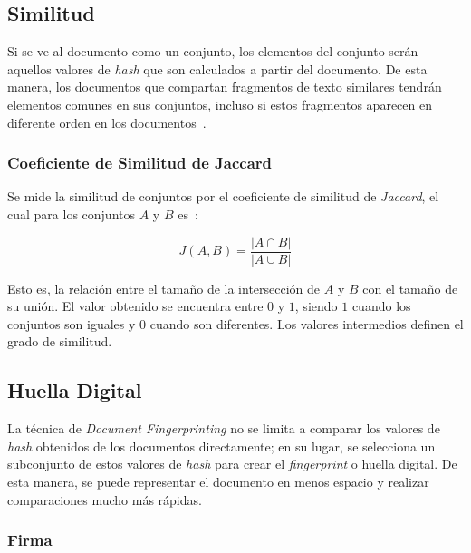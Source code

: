 \subsection{Similitud}

Si se ve al documento como un conjunto, los elementos del conjunto serán aquellos valores de \textit{hash} que son calculados a partir del documento.
De esta manera, los documentos que compartan fragmentos de texto similares tendrán elementos comunes en sus conjuntos,
incluso si estos fragmentos aparecen en diferente orden en los documentos~\cite{Rajaraman:2011:MMD:2124405}.

\subsubsection{Coeficiente de Similitud de Jaccard}

Se mide la similitud de conjuntos por el coeficiente de similitud de \textit{Jaccard},
el cual para los conjuntos $A$ y $B$ es~\cite{Rajaraman:2011:MMD:2124405}:

\begin{equation*}
J(A, B) = \frac{|A \cap B|}{|A \cup B|}
\end{equation*}

Esto es, la relación entre el tamaño de la intersección de $A$ y $B$ con el tamaño de su unión.
El valor obtenido se encuentra entre $0$ y $1$, 
siendo $1$ cuando los conjuntos son iguales y 
$0$ cuando son diferentes. 
Los valores intermedios definen el grado de similitud.

\subsection{Huella Digital}

La técnica de \textit{Document Fingerprinting} no se limita a 
comparar los valores de \textit{hash} obtenidos de los documentos directamente; 
en su lugar, se selecciona un subconjunto de estos valores de \textit{hash}
para crear el \textit{fingerprint} o huella digital.
De esta manera, se puede representar el documento en menos espacio
y realizar comparaciones mucho más rápidas.

\subsubsection{Firma}

